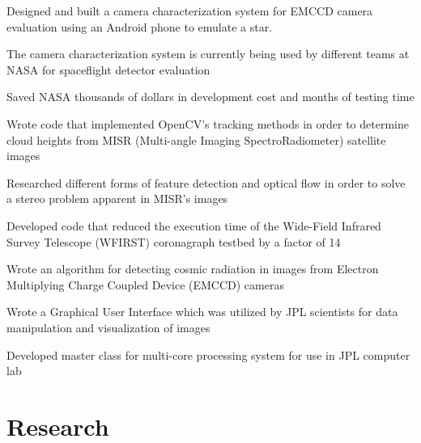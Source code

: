 \documentclass[letterpaper]{deedy-resume} %
\begin{document}
\begin{minipage}[t]{0.66\textwidth}
\begin{tightitemize}
	\item 	Designed and built a camera characterization system for EMCCD camera evaluation using an Android phone to emulate a star.
	\item 	The camera characterization system is currently being used by different teams at NASA for spaceflight detector evaluation 
	\item Saved NASA thousands of dollars in development cost and months of testing time 
\end{tightitemize}
\begin{tightitemize}
	\item  	Wrote code that implemented OpenCV's tracking methods in order to determine cloud heights from MISR (Multi-angle Imaging SpectroRadiometer) satellite images  
	\item 	Researched different forms of feature detection and optical flow in order to solve a stereo problem apparent in MISR’s images 
\end{tightitemize}
\begin{tightitemize}
	\item 	Developed code that reduced the execution time of the Wide-Field Infrared Survey Telescope (WFIRST) coronagraph testbed by a factor of 14
	\item 	Wrote an algorithm for detecting cosmic radiation in images from Electron Multiplying Charge Coupled Device (EMCCD) cameras 
\end{tightitemize}
\begin{tightitemize}
	\item 	Wrote a Graphical User Interface which was utilized by JPL scientists for data manipulation and visualization of images 
	\item 	Developed master class for multi-core processing system for use in JPL computer lab 
\end{tightitemize}

\sectionspace %

\section{Research}


\end{minipage}
\end{document}
